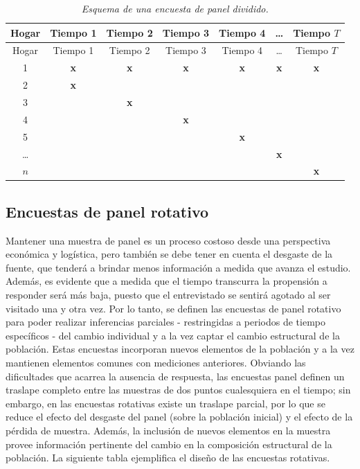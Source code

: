 \documentclass[
  12pt,
  spanish,
]{book}
\begin{document}
\begin{longtable}[]{@{}ccccccc@{}}
\caption{\emph{Esquema de una encuesta de panel dividido.}}\tabularnewline
\toprule
Hogar & Tiempo 1 & Tiempo 2 & Tiempo 3 & Tiempo 4 & \ldots{} & Tiempo \(T\) \\
\midrule
\endfirsthead
\toprule
Hogar & Tiempo 1 & Tiempo 2 & Tiempo 3 & Tiempo 4 & \ldots{} & Tiempo \(T\) \\
\midrule
\endhead
1 & \textbf{x} & \textbf{x} & \textbf{x} & \textbf{x} & \textbf{x} & \textbf{x} \\
2 & \textbf{x} & & & & & \\
3 & & \textbf{x} & & & & \\
4 & & & \textbf{x} & & & \\
5 & & & & \textbf{x} & & \\
\ldots{} & & & & & \textbf{x} & \\
\(n\) & & & & & & \textbf{x} \\
\bottomrule
\end{longtable}

\hypertarget{encuestas-de-panel-rotativo}{%
\subsection{Encuestas de panel rotativo}\label{encuestas-de-panel-rotativo}}

Mantener una muestra de panel es un proceso costoso desde una perspectiva económica y logística, pero también se debe tener en cuenta el desgaste de la fuente, que tenderá a brindar menos información a medida que avanza el estudio. Además, es evidente que a medida que el tiempo transcurra la propensión a responder será más baja, puesto que el entrevistado se sentirá agotado al ser visitado una y otra vez. Por lo tanto, se definen las encuestas de panel rotativo para poder realizar inferencias parciales - restringidas a periodos de tiempo específicos - del cambio individual y a la vez captar el cambio estructural de la población. Estas encuestas incorporan nuevos elementos de la población y a la vez mantienen elementos comunes con mediciones anteriores. Obviando las dificultades que acarrea la ausencia de respuesta, las encuestas panel definen un traslape completo entre las muestras de dos puntos cualesquiera en el tiempo; sin embargo, en las encuestas rotativas existe un traslape parcial, por lo que se reduce el efecto del desgaste del panel (sobre la población inicial) y el efecto de la pérdida de muestra. Además, la inclusión de nuevos elementos en la muestra provee información pertinente del cambio en la composición estructural de la población. La siguiente tabla ejemplifica el diseño de las encuestas rotativas.
\end{document}
